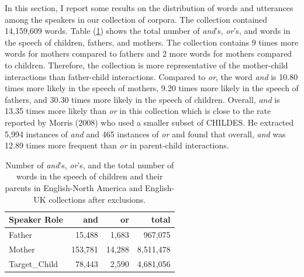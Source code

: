 \documentclass[,man,floatsintext]{apa6}
\begin{document}
In this section, I report some results on the distribution of words and utterances among the speakers in our collection of corpora. The collection contained 14,159,609 words. Table (\ref{tab:countTable}) shows the total number of \emph{and}'s, \emph{or}'s, and words in the speech of children, fathers, and mothers. The collection contains 9 times more words for mothers compared to fathers and 2 more words for mothers compared to children. Therefore, the collection is more representative of the mother-child interactions than father-child interactions. Compared to \emph{or}, the word \emph{and} is 10.80 times more likely in the speech of mothers, 9.20 times more likely in the speech of fathers, and 30.30 times more likely in the speech of children. Overall, \emph{and} is 13.35 times more likely than \emph{or} in this collection which is close to the rate reported by Morris (2008) who used a smaller subset of CHILDES. He extracted 5,994 instances of \emph{and} and 465 instances of \emph{or} and found that overall, \emph{and} was 12.89 times more frequent than \emph{or} in parent-child interactions.

\begin{table}

\caption{\label{tab:countTable}Number of \textit{and}'s, \textit{or}'s, and the total number of words in the speech of children and their parents in English-North America and English-UK collections after exclusions.}
\centering
\begin{tabular}[t]{l|r|r|r}
\hline
Speaker Role & and & or & total\\
\hline
Father & 15,488 & 1,683 & 967,075\\
\hline
Mother & 153,781 & 14,288 & 8,511,478\\
\hline
Target\_Child & 78,443 & 2,590 & 4,681,056\\
\hline
\end{tabular}
\end{table}
\end{document}
